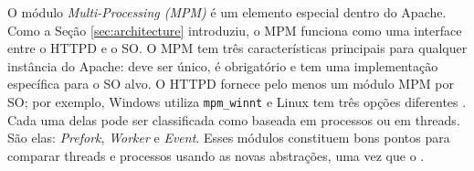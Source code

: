 O módulo \textit{Multi-Processing (MPM)} é um elemento especial dentro do
Apache. Como a Seção \ref{sec:architecture} introduziu, o MPM funciona como uma
interface entre o HTTPD e o SO. O MPM tem três características principais para
qualquer instância do Apache: deve ser único, é obrigatório e tem uma
implementação específica para o SO alvo. O HTTPD fornece pelo menos um módulo
MPM por SO; por exemplo, Windows utiliza \texttt{mpm\_winnt} e Linux tem
três opções diferentes . Cada uma
delas pode ser classificada como baseada em processos ou em
threads. São elas: \textit{Prefork}, \textit{Worker} e
\textit{Event}. Esses módulos constituem bons pontos para comparar threads e
processos usando as novas abstrações, uma vez que o .

